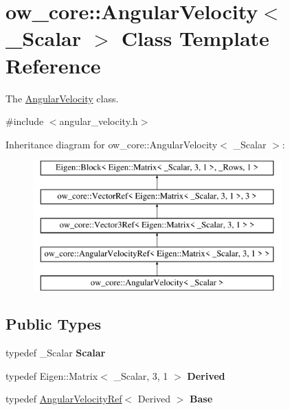\hypertarget{classow__core_1_1AngularVelocity}{}\section{ow\+\_\+core\+:\+:Angular\+Velocity$<$ \+\_\+\+Scalar $>$ Class Template Reference}
\label{classow__core_1_1AngularVelocity}


The \hyperlink{classow__core_1_1AngularVelocity}{Angular\+Velocity} class.  




{\ttfamily \#include $<$angular\+\_\+velocity.\+h$>$}

Inheritance diagram for ow\+\_\+core\+:\+:Angular\+Velocity$<$ \+\_\+\+Scalar $>$\+:\begin{figure}[H]
\begin{center}
\leavevmode
\includegraphics[height=5.000000cm]{d2/da5/classow__core_1_1AngularVelocity}
\end{center}
\end{figure}
\subsection*{Public Types}
\begin{DoxyCompactItemize}
\item 
typedef \+\_\+\+Scalar {\bfseries Scalar}\hypertarget{classow__core_1_1AngularVelocity_ae9c8b95a9177664cf39bd57d667a0fce}{}\label{classow__core_1_1AngularVelocity_ae9c8b95a9177664cf39bd57d667a0fce}

\item 
typedef Eigen\+::\+Matrix$<$ \+\_\+\+Scalar, 3, 1 $>$ {\bfseries Derived}\hypertarget{classow__core_1_1AngularVelocity_a68c6384723283174f366f4faf4693ceb}{}\label{classow__core_1_1AngularVelocity_a68c6384723283174f366f4faf4693ceb}

\item 
typedef \hyperlink{classow__core_1_1AngularVelocityRef}{Angular\+Velocity\+Ref}$<$ Derived $>$ {\bfseries Base}\hypertarget{classow__core_1_1AngularVelocity_a8490799ea74a7119140dd3c32007f78c}{}\label{classow__core_1_1AngularVelocity_a8490799ea74a7119140dd3c32007f78c}

\end{DoxyCompactItemize}
